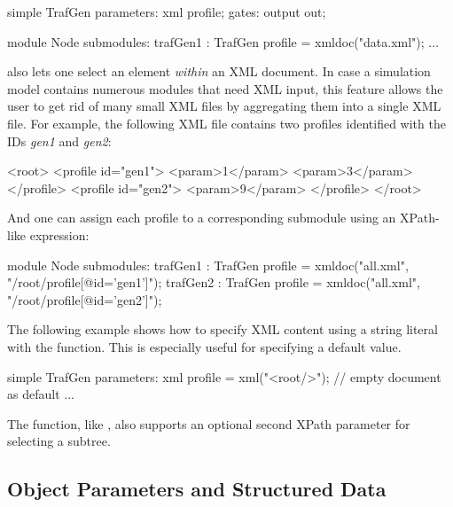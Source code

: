 \begin{ned}
simple TrafGen {
    parameters:
        xml profile;
    gates:
        output out;
}

module Node {
    submodules:
        trafGen1 : TrafGen {
            profile = xmldoc("data.xml");
        }
        ...
}
\end{ned}

 also lets one select an element \textit{within} an XML
document. In case a simulation model contains numerous modules that need XML
input, this feature allows the user to get rid of many small XML files by
aggregating them into a single XML file. For example, the following XML file
contains two profiles identified with the IDs \textit{gen1} and \textit{gen2}:

\begin{xml}
<root>
    <profile id="gen1">
          <param>1</param>
          <param>3</param>
    </profile>
    <profile id="gen2">
          <param>9</param>
    </profile>
</root>
\end{xml}

And one can assign each profile to a corresponding submodule using an XPath-like expression:

\begin{ned}
module Node {
    submodules:
        trafGen1 : TrafGen {
            profile = xmldoc("all.xml", "/root/profile[@id='gen1']");
        }
        trafGen2 : TrafGen {
            profile = xmldoc("all.xml", "/root/profile[@id='gen2']");
        }
}
\end{ned}

The following example shows how to specify XML content using a string literal
with the  function. This is especially useful for specifying a
default value.

\begin{ned}
simple TrafGen {
    parameters:
        xml profile = xml("<root/>"); // empty document as default
        ...
}
\end{ned}

The  function, like , also supports an
optional second XPath parameter for selecting a subtree.



\subsection{Object Parameters and Structured Data}
\label{sec:ned-lang:object-parameters}

